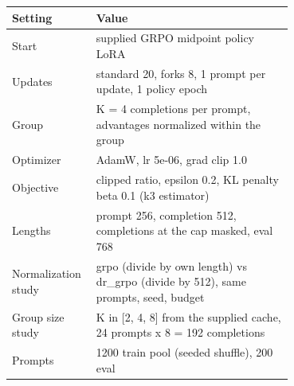 \begin{tabular}{lp{0.70\linewidth}}
\toprule
Setting & Value \\
\midrule
Start & supplied GRPO midpoint policy LoRA \\
Updates & standard 20, forks 8, 1 prompt per update, 1 policy epoch \\
Group & K = 4 completions per prompt, advantages normalized within the group \\
Optimizer & AdamW, lr 5e-06, grad clip 1.0 \\
Objective & clipped ratio, epsilon 0.2, KL penalty beta 0.1 (k3 estimator) \\
Lengths & prompt 256, completion 512, completions at the cap masked, eval 768 \\
Normalization study & grpo (divide by own length) vs dr\_grpo (divide by 512), same prompts, seed, budget \\
Group size study & K in [2, 4, 8] from the supplied cache, 24 prompts x 8 = 192 completions \\
Prompts & 1200 train pool (seeded shuffle), 200 eval \\
\bottomrule
\end{tabular}
